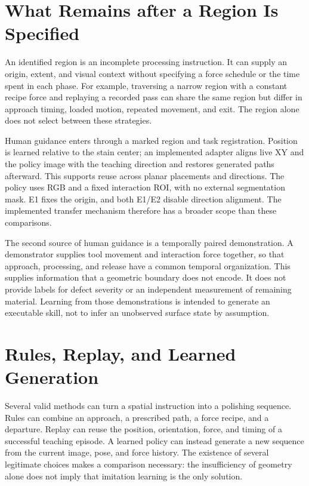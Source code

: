 \section{What Remains after a Region Is Specified}
An identified region is an incomplete processing instruction. It can supply an origin, extent, and visual context without specifying a force schedule or the time spent in each phase. For example, traversing a narrow region with a constant recipe force and replaying a recorded pass can share the same region but differ in approach timing, loaded motion, repeated movement, and exit. The region alone does not select between these strategies.

Human guidance enters through a marked region and task registration. Position is learned relative to the stain center; an implemented adapter aligns live XY and the policy image with the teaching direction and restores generated paths afterward. This supports reuse across planar placements and directions. The policy uses RGB and a fixed interaction ROI, with no external segmentation mask. E1 fixes the origin, and both E1/E2 disable direction alignment. The implemented transfer mechanism therefore has a broader scope than these comparisons.

The second source of human guidance is a temporally paired demonstration. A demonstrator supplies tool movement and interaction force together, so that approach, processing, and release have a common temporal organization. This supplies information that a geometric boundary does not encode. It does not provide labels for defect severity or an independent measurement of remaining material. Learning from those demonstrations is intended to generate an executable skill, not to infer an unobserved surface state by assumption.

\section{Rules, Replay, and Learned Generation}
Several valid methods can turn a spatial instruction into a polishing sequence. Rules can combine an approach, a prescribed path, a force recipe, and a departure. Replay can reuse the position, orientation, force, and timing of a successful teaching episode. A learned policy can instead generate a new sequence from the current image, pose, and force history. The existence of several legitimate choices makes a comparison necessary: the insufficiency of geometry alone does not imply that imitation learning is the only solution.

